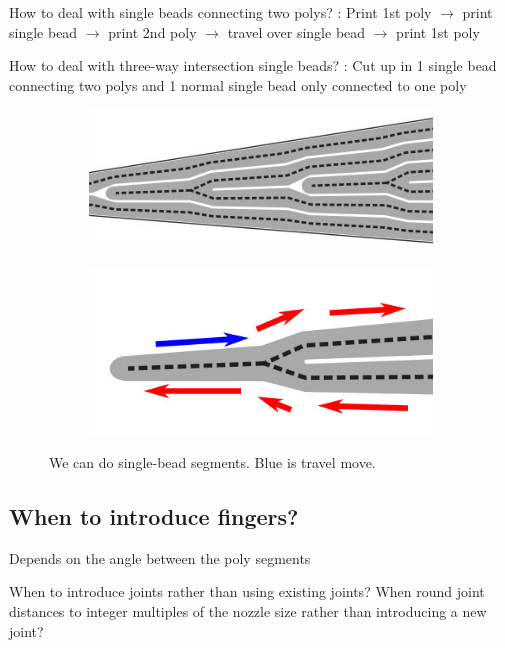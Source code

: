 How to deal with single beads connecting two polys?
: Print 1st poly $\to$ print single bead $\to$ print 2nd poly $\to$ travel over single bead $\to$ print 1st poly

How to deal with three-way intersection single beads?
: Cut up in 1 single bead connecting two polys and 1 normal single bead only connected to one poly

\begin{figure}
\begin{subfigure}{0.45\columnwidth}
\includegraphics[width=\columnwidth]{sources/method/single_bead_strategy.jpg}
\end{subfigure}
\begin{subfigure}{0.45\columnwidth}
\includegraphics[width=\columnwidth]{sources/method/single_bead_strategy_order.jpg}
\end{subfigure}
\caption{We can do single-bead segments. Blue is travel move.}
\label{single_bead_strategy}
\end{figure}


\subsection{When to introduce fingers?}
Depends on the angle between the poly segments

When to introduce joints rather than using existing joints? When round joint distances to integer multiples of the nozzle size rather than introducing a new joint?

